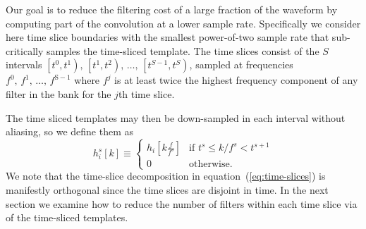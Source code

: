 Our goal is to reduce the filtering cost of a
large fraction of the waveform by computing part of the convolution at a lower
sample rate.  Specifically we consider here time slice boundaries with the
smallest power-of-two sample rate that sub-critically samples the time-sliced
template.  The time slices consist of the $S$ intervals
$\left[t^0, t^1\right),\, \left[t^1, t^2\right),\, \dots,\, \left[t^{S-1}, t^S\right)$,
sampled at frequencies $f^0,\, f^1,\, \dots,\, f^\mathrm{S-1}$ where $f^j$ is at
least twice the highest frequency component of any filter in the bank for the $j$th
time slice.

The time sliced templates may then be down-sampled in each interval without
aliasing, so we define them as
%
\begin{equation}
\label{eq:time-sliced-templates}
h_{i}^{s}[k] \equiv
	\begin{cases}
		h_{i}\!\left[k\frac{f}{f^s}\right] & \textrm{if } t^s \leqslant k/f^s < t^{s+1} \\
		0 & \textrm{otherwise.}
	\end{cases}
\end{equation}
%
We note that the time-slice decomposition in equation~(\ref{eq:time-slices}) is
manifestly orthogonal since the time slices are disjoint in time.  In the next
section we examine how to reduce the number of filters within each time slice
via \SVD{} of the time-sliced templates.

